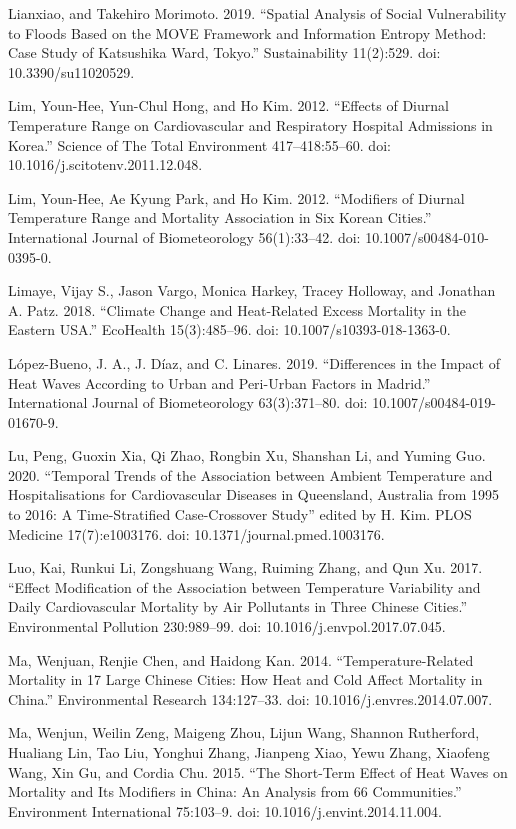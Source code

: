 \documentclass[12pt]{article}
\begin{document}
Lianxiao, and Takehiro Morimoto. 2019. ``Spatial Analysis of Social
Vulnerability to Floods Based on the MOVE Framework and Information
Entropy Method: Case Study of Katsushika Ward, Tokyo.'' Sustainability
11(2):529. doi: 10.3390/su11020529.

Lim, Youn-Hee, Yun-Chul Hong, and Ho Kim. 2012. ``Effects of Diurnal
Temperature Range on Cardiovascular and Respiratory Hospital Admissions
in Korea.'' Science of The Total Environment 417--418:55--60. doi:
10.1016/j.scitotenv.2011.12.048.

Lim, Youn-Hee, Ae Kyung Park, and Ho Kim. 2012. ``Modifiers of Diurnal
Temperature Range and Mortality Association in Six Korean Cities.''
International Journal of Biometeorology 56(1):33--42. doi:
10.1007/s00484-010-0395-0.

Limaye, Vijay S., Jason Vargo, Monica Harkey, Tracey Holloway, and
Jonathan A. Patz. 2018. ``Climate Change and Heat-Related Excess
Mortality in the Eastern USA.'' EcoHealth 15(3):485--96. doi:
10.1007/s10393-018-1363-0.

López-Bueno, J. A., J. Díaz, and C. Linares. 2019. ``Differences in the
Impact of Heat Waves According to Urban and Peri-Urban Factors in
Madrid.'' International Journal of Biometeorology 63(3):371--80. doi:
10.1007/s00484-019-01670-9.

Lu, Peng, Guoxin Xia, Qi Zhao, Rongbin Xu, Shanshan Li, and Yuming Guo.
2020. ``Temporal Trends of the Association between Ambient Temperature
and Hospitalisations for Cardiovascular Diseases in Queensland,
Australia from 1995 to 2016: A Time-Stratified Case-Crossover Study''
edited by H. Kim. PLOS Medicine 17(7):e1003176. doi:
10.1371/journal.pmed.1003176.

Luo, Kai, Runkui Li, Zongshuang Wang, Ruiming Zhang, and Qun Xu. 2017.
``Effect Modification of the Association between Temperature Variability
and Daily Cardiovascular Mortality by Air Pollutants in Three Chinese
Cities.'' Environmental Pollution 230:989--99. doi:
10.1016/j.envpol.2017.07.045.

Ma, Wenjuan, Renjie Chen, and Haidong Kan. 2014. ``Temperature-Related
Mortality in 17 Large Chinese Cities: How Heat and Cold Affect Mortality
in China.'' Environmental Research 134:127--33. doi:
10.1016/j.envres.2014.07.007.

Ma, Wenjun, Weilin Zeng, Maigeng Zhou, Lijun Wang, Shannon Rutherford,
Hualiang Lin, Tao Liu, Yonghui Zhang, Jianpeng Xiao, Yewu Zhang,
Xiaofeng Wang, Xin Gu, and Cordia Chu. 2015. ``The Short-Term Effect of
Heat Waves on Mortality and Its Modifiers in China: An Analysis from 66
Communities.'' Environment International 75:103--9. doi:
10.1016/j.envint.2014.11.004.
\end{document}
